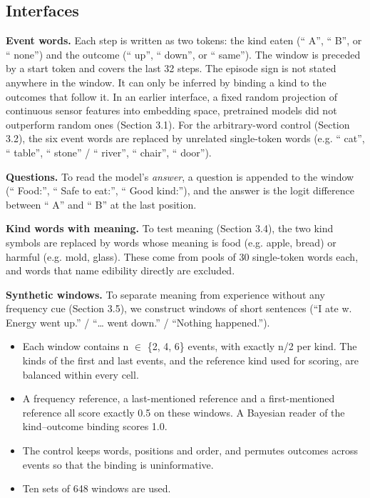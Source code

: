 \documentclass[11pt]{article}
\begin{document}
\subsection{Interfaces}

\textbf{Event words.} Each step is written as two tokens: the kind eaten (`` A'', `` B'', or `` none'') and the outcome (`` up'', `` down'', or `` same''). The window is preceded by a start token and covers the last 32 steps. The episode sign is not stated anywhere in the window. It can only be inferred by binding a kind to the outcomes that follow it. In an earlier interface, a fixed random projection of continuous sensor features into embedding space, pretrained models did not outperform random ones (Section 3.1). For the arbitrary-word control (Section 3.2), the six event words are replaced by unrelated single-token words (e.g. `` cat'', `` table'', `` stone'' / `` river'', `` chair'', `` door'').

\textbf{Questions.} To read the model's \emph{answer}, a question is appended to the window (`` Food:'', `` Safe to eat:'', `` Good kind:''), and the answer is the logit difference between `` A'' and `` B'' at the last position.

\textbf{Kind words with meaning.} To test meaning (Section 3.4), the two kind symbols are replaced by words whose meaning is food (e.g. apple, bread) or harmful (e.g. mold, glass). These come from pools of 30 single-token words each, and words that name edibility directly are excluded.

\textbf{Synthetic windows.} To separate meaning from experience without any frequency cue (Section 3.5), we construct windows of short sentences (``I ate w. Energy went up.'' / ``\ldots{} went down.'' / ``Nothing happened.'').
\begin{itemize}
\item Each window contains n $\in$ \{2, 4, 6\} events, with exactly n/2 per kind. The kinds of the first and last events, and the reference kind used for scoring, are balanced within every cell.
\item A frequency reference, a last-mentioned reference and a first-mentioned reference all score exactly 0.5 on these windows. A Bayesian reader of the kind--outcome binding scores 1.0.
\item The control keeps words, positions and order, and permutes outcomes across events so that the binding is uninformative.
\item Ten sets of 648 windows are used.
\end{itemize}
\end{document}
